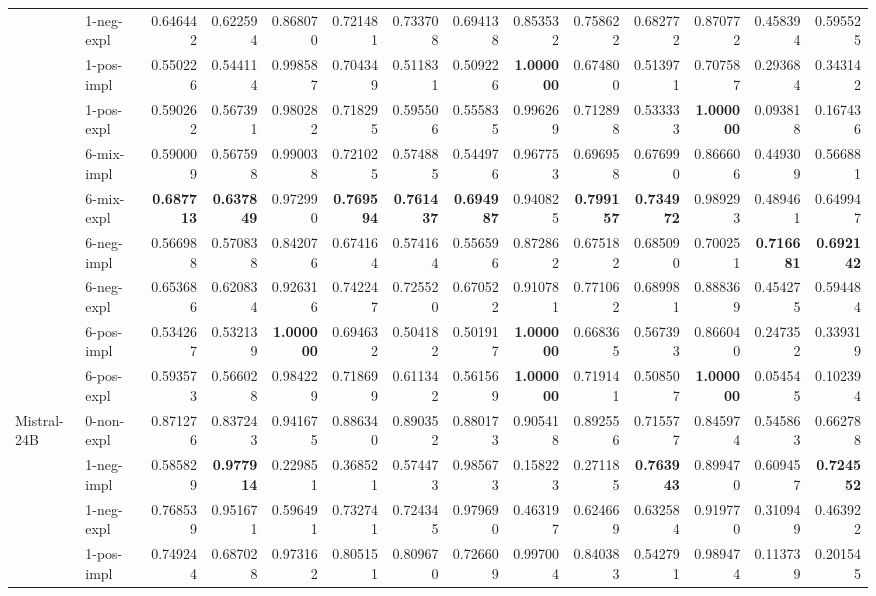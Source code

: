 \begin{tabular}{ll|rrrr|rrrr|rrrr}
 & 1-neg-expl & 0.646442 & 0.622594 & 0.868070 & 0.721481 & 0.733708 & 0.694138 & 0.853532 & 0.758622 & 0.682772 & 0.870772 & 0.458394 & 0.595525 \\
 & 1-pos-impl & 0.550226 & 0.544114 & 0.998587 & 0.704349 & 0.511831 & 0.509226 & \bfseries 1.000000 & 0.674800 & 0.513971 & 0.707587 & 0.293684 & 0.343142 \\
 & 1-pos-expl & 0.590262 & 0.567391 & 0.980282 & 0.718295 & 0.595506 & 0.555835 & 0.996269 & 0.712898 & 0.533333 & \bfseries 1.000000 & 0.093818 & 0.167436 \\
 & 6-mix-impl & 0.590009 & 0.567598 & 0.990038 & 0.721025 & 0.574885 & 0.544976 & 0.967753 & 0.696958 & 0.676990 & 0.866606 & 0.449309 & 0.566881 \\
 & 6-mix-expl & \bfseries 0.687713 & \bfseries 0.637849 & 0.972990 & \bfseries 0.769594 & \bfseries 0.761437 & \bfseries 0.694987 & 0.940825 & \bfseries 0.799157 & \bfseries 0.734972 & 0.989293 & 0.489461 & 0.649947 \\
 & 6-neg-impl & 0.566988 & 0.570838 & 0.842076 & 0.674164 & 0.574164 & 0.556596 & 0.872862 & 0.675182 & 0.685090 & 0.700251 & \bfseries 0.716681 & \bfseries 0.692142 \\
 & 6-neg-expl & 0.653686 & 0.620834 & 0.926316 & 0.742247 & 0.725520 & 0.670522 & 0.910781 & 0.771062 & 0.689981 & 0.888369 & 0.454275 & 0.594484 \\
 & 6-pos-impl & 0.534267 & 0.532139 & \bfseries 1.000000 & 0.694632 & 0.504182 & 0.501917 & \bfseries 1.000000 & 0.668365 & 0.567393 & 0.866040 & 0.247352 & 0.339319 \\
 & 6-pos-expl & 0.593573 & 0.566028 & 0.984229 & 0.718699 & 0.611342 & 0.561569 & \bfseries 1.000000 & 0.719141 & 0.508507 & \bfseries 1.000000 & 0.054545 & 0.102394 \\
 \midrule
\multirow[c]{11}{*}{Mistral-24B} & 0-non-expl & 0.871276 & 0.837243 & 0.941675 & 0.886340 & 0.890352 & 0.880173 & 0.905418 & 0.892556 & 0.715577 & 0.845974 & 0.545863 & 0.662788 \\
 & 1-neg-impl & 0.585829 & \bfseries 0.977914 & 0.229851 & 0.368521 & 0.574473 & 0.985673 & 0.158223 & 0.271185 & \bfseries 0.763943 & 0.899470 & 0.609457 & \bfseries 0.724552 \\
 & 1-neg-expl & 0.768539 & 0.951671 & 0.596491 & 0.732741 & 0.724345 & 0.979690 & 0.463197 & 0.624669 & 0.632584 & 0.919770 & 0.310949 & 0.463922 \\
 & 1-pos-impl & 0.749244 & 0.687028 & 0.973162 & 0.805151 & 0.809670 & 0.726609 & 0.997004 & 0.840383 & 0.542791 & 0.989474 & 0.113739 & 0.201545 \\

\end{tabular}
